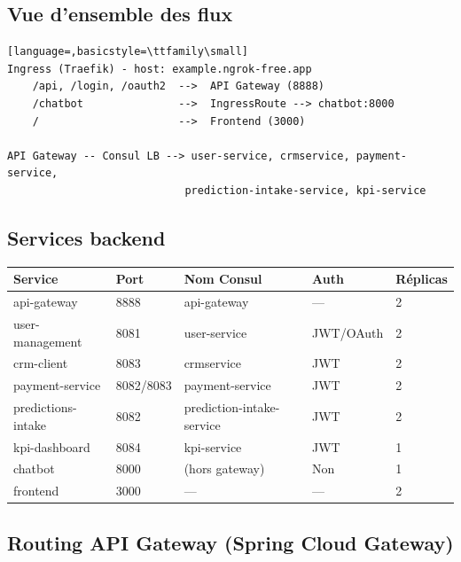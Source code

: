 \documentclass[11pt,a4paper]{article}
\begin{document}
\subsection{Vue d'ensemble des flux}

\begin{lstlisting}[language=,basicstyle=\ttfamily\small]
Ingress (Traefik) - host: example.ngrok-free.app
    /api, /login, /oauth2  -->  API Gateway (8888)
    /chatbot               -->  IngressRoute --> chatbot:8000
    /                      -->  Frontend (3000)

API Gateway -- Consul LB --> user-service, crmservice, payment-service,
                            prediction-intake-service, kpi-service
\end{lstlisting}

\subsection{Services backend}

\begin{center}
\begin{tabular}{@{}lllll@{}}
\toprule
\textbf{Service} & \textbf{Port} & \textbf{Nom Consul} & \textbf{Auth} & \textbf{Réplicas} \\
\midrule
api-gateway       & 8888 & api-gateway        & —      & 2 \\
user-management   & 8081 & user-service       & JWT/OAuth & 2 \\
crm-client        & 8083 & crmservice         & JWT    & 2 \\
payment-service   & 8082/8083 & payment-service & JWT   & 2 \\
predictions-intake& 8082 & prediction-intake-service & JWT & 2 \\
kpi-dashboard     & 8084 & kpi-service        & JWT    & 1 \\
chatbot           & 8000 & (hors gateway)     & Non    & 1 \\
frontend          & 3000 & —                  & —      & 2 \\
\bottomrule
\end{tabular}
\end{center}

\subsection{Routing API Gateway (Spring Cloud Gateway)}
\end{document}
